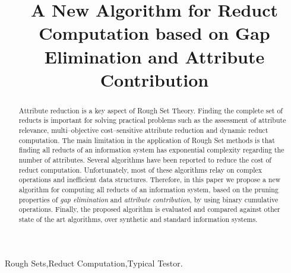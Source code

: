 \documentclass[authoryear,preprint,review,12pt]{elsarticle}
\begin{document}
	
	\title{A New Algorithm for Reduct Computation based on Gap Elimination 
		   and Attribute Contribution}
		
	
	\address{Computer Science Department\\National Institute of
	Astrophysics, Optics and Electronics\\
	Luis Enrique Erro \# 1, Santa Mar\'{\i}a Tonantzintla, Puebla,
	72840, M\'{e}xico} 
	
	\begin{abstract}
		Attribute reduction is a key aspect of Rough Set Theory.  Finding the complete set of reducts is important 
		for solving practical problems such as the assessment of attribute relevance, multi--objective 
		cost--sensitive attribute reduction and dynamic reduct computation. The main limitation in the application
		of Rough Set methods is that finding all reducts of an information system has exponential complexity 
		regarding the number of attributes. Several algorithms have been reported to reduce the cost
		of reduct computation. Unfortunately, most of these algorithms relay on complex operations and inefficient data structures. Therefore, in this paper we propose a new algorithm for computing all reducts of an
		information system, based on the pruning properties of \textit{gap elimination} and \textit{attribute contribution}, by using binary cumulative operations. Finally, the proposed algorithm is evaluated and compared against other state of the art algorithms, over synthetic and standard information systems.
	\end{abstract}
	
	\begin{keyword}
		Rough Sets\sep Reduct Computation\sep Typical Testor.
	\end{keyword}

	\maketitle

\end{document}
